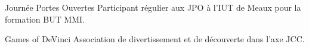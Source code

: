



\begin{cvskills}
  \cvskill
    {Journée Portes Ouvertes} %
    {Participant régulier aux JPO à l'IUT de Meaux pour la formation BUT MMI.} %

  \cvskill
    {Games of DeVinci} %
    {Association de divertissement et de découverte dans l'axe JCC.} %

\end{cvskills}